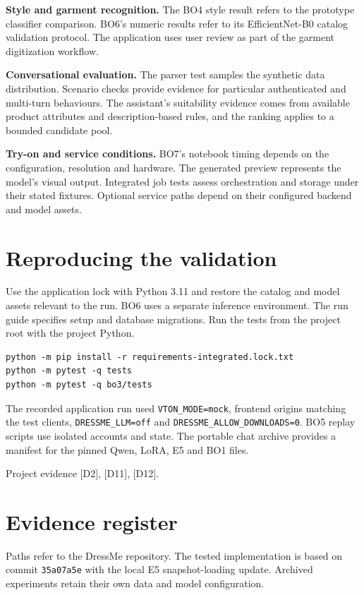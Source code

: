 \documentclass[11pt,a4paper]{article}
\newcommand{\src}[1]{\par{\footnotesize\textcolor{muted}{Project evidence #1.}}\par}
\newcommand{\file}[1]{\nolinkurl{#1}}
\begin{document}
\textbf{Style and garment recognition.} The BO4 style result refers to the prototype classifier comparison. BO6's numeric results refer to its EfficientNet-B0 catalog validation protocol. The application uses user review as part of the garment digitization workflow.

\textbf{Conversational evaluation.} The parser test samples the synthetic data distribution. Scenario checks provide evidence for particular authenticated and multi-turn behaviours. The assistant's suitability evidence comes from available product attributes and description-based rules, and the ranking applies to a bounded candidate pool.

\textbf{Try-on and service conditions.} BO7's notebook timing depends on the configuration, resolution and hardware. The generated preview represents the model's visual output. Integrated job tests assess orchestration and storage under their stated fixtures. Optional service paths depend on their configured backend and model assets.

\section{Reproducing the validation}
Use the application lock with Python 3.11 and restore the catalog and model assets relevant to the run. BO6 uses a separate inference environment. The run guide specifies setup and database migrations. Run the tests from the project root with the project Python.

\begin{verbatim}
python -m pip install -r requirements-integrated.lock.txt
python -m pytest -q tests
python -m pytest -q bo3/tests
\end{verbatim}

The recorded application run used \file{VTON_MODE=mock}, frontend origins matching the test clients, \file{DRESSME_LLM=off} and \file{DRESSME_ALLOW_DOWNLOADS=0}. BO5 replay scripts use isolated accounts and state. The portable chat archive provides a manifest for the pinned Qwen, LoRA, E5 and BO1 files.
\src{[D2], [D11], [D12]}

\clearpage
\section{Evidence register}
Paths refer to the DressMe repository. The tested implementation is based on commit \file{35a07a5e} with the local E5 snapshot-loading update. Archived experiments retain their own data and model configuration.
\end{document}
